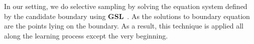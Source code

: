 

 



In our setting, %
we do selective sampling by solving the equation system defined by the candidate boundary using \textbf{GSL}~\cite{gough2009gnu}.
As the solutions to boundary equation are the points lying on the boundary. 
As a result, this technique is applied all along the learning process except the very beginning.

